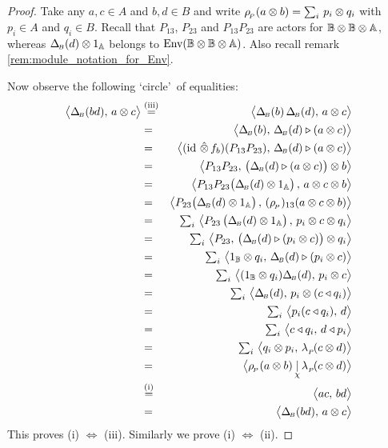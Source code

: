 \begin{proof}
Take any $a,c\in A$ and $b,d\in B$ and write
$\rho_{_{\!P}}(a \otimes b) = \sum_i \,p_i \otimes q_i$ with $p_i \in A$ and $q_i \in B$.
Recall that $P_{13}$, $P_{23}$ and $P_{13} P_{23}$ are actors for
$\mathbb{B} \otimes \mathbb{B} \otimes \mathbb{A}$, whereas $\Delta_{\scriptscriptstyle \! B}(d) \otimes 1_{\mathbb{A}}$ belongs to $\mbox{\rm Env}(\mathbb{B} \otimes \mathbb{B} \otimes \mathbb{A})$.
Also recall remark \ref{rem:module_notation_for_Env}\@.

Now observe the following \lq circle\rq\ of equalities:
\begin{eqnarray*}
      \pairM{\DeltaB(bd)}{a \tens c}
&\stackrel{\rm (iii)}{=}&
      \pairM{\DeltaB(b) \, \DeltaB(d)}{a \tens c}
\\&=&
      \pairM{\DeltaB(b)}{\DeltaB(d) \lact (a \tens c)}
\\&=&
      \pairM{(\id\, \slice f_b)(P_{13} P_{23})}{\DeltaB(d) \lact (a \tens c)}
\\&=&
      \pairM{P_{13} P_{23}}{\left( \vertM \DeltaB(d) \lact (a \tens c)\right) \tens b}
\\&=&
      \pairM{P_{13} P_{23} \! \left( \vertM \DeltaB(d) \tens 1_\Aa \right)}{a \tens c \tens b}
\\&=&
      \pairM{P_{23} \! \left( \vertM \DeltaB(d) \tens 1_\Aa
                   \right)}{ (\rp)_{13}(a \tens c \tens b)}
\\&=&
      \textstyle \sum_i \,
      \pairM{P_{23} \left( \vertM \DeltaB(d) \tens 1_\Aa
                   \right)}{p_i \tens c \tens q_i}
\\&=&
      \textstyle \sum_i \,
      \pairM{P_{23}}{\left( \vertM \DeltaB(d) \lact (p_i \tens c)\right) \tens q_i}
\\&=&
      \textstyle \sum_i \,
      \pairM{1_\BB \tens q_i}{ \DeltaB(d) \lact (p_i \tens c)}
\\&=&
      \textstyle \sum_i \,
      \pairM{(1_\BB \tens q_i) \DeltaB(d)}{p_i \tens c}
\\&=&
      \textstyle \sum_i \,  \pairM{\DeltaB(d)}{p_i \tens (c \ract q_i)}
\\&=&
      \textstyle \sum_i \,  \pairM{p_i(c \ract q_i)}{d}
\\&=&
      \textstyle \sum_i \,  \pairM{c \ract q_i}{d \ract p_i}
\\&=&
      \textstyle \sum_i \,  \pairM{q_i \tens p_i}{\lp(c \tens d)}
\\&=&
      \pairflipM{\rp(a \tens b)}{\lp(c \tens d)}
\\&\stackrel{\rm (i)}{=}&
      \pairM{ac}{bd}
\\&=&
      \pairM{\DeltaB(bd)}{a \tens c}
\end{eqnarray*}
This proves (i) $\Leftrightarrow$ (iii). Similarly we prove (i) $\Leftrightarrow$ (ii).
\end{proof}



